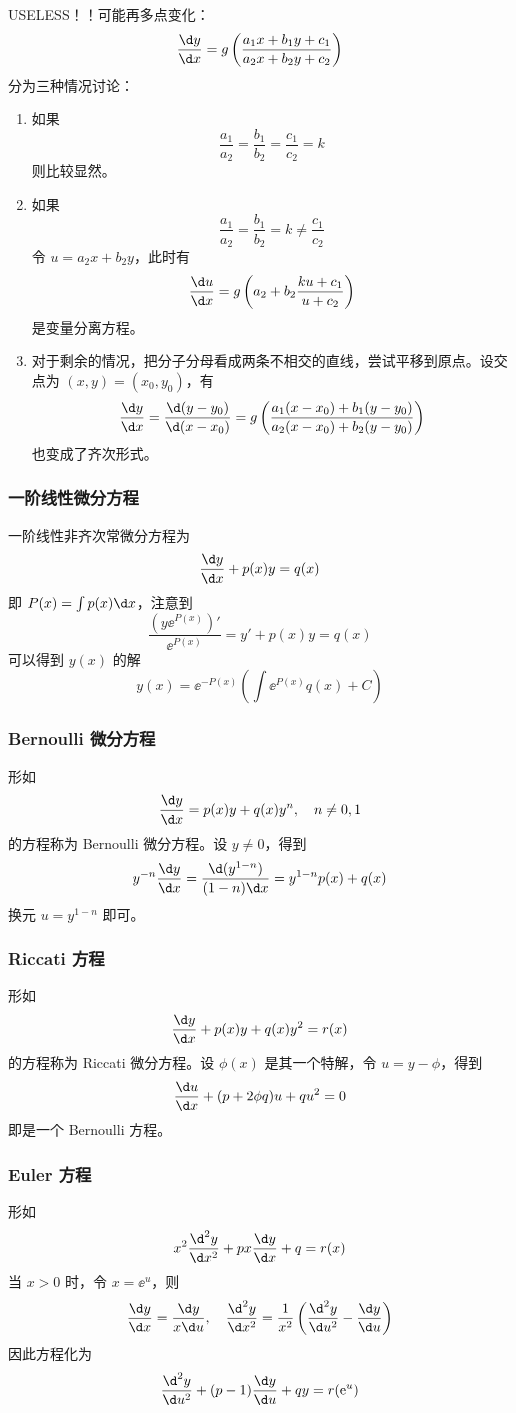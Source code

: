 USELESS！！可能再多点变化：
\[ \frac{\d y}{\d x} = g \left(\frac{a_1 x + b_1 y + c_1}{a_2 x + b_2 y + c_2}\right) \]
分为三种情况讨论：
\begin{enumerate}
	\item 如果
	      \[ \frac{a_1}{a_2} = \frac{b_1}{b_2} = \frac{c_1}{c_2} = k \]
	      则比较显然。
	\item 如果
	      \[ \frac{a_1}{a_2} = \frac{b_1}{b_2} = k \neq \frac{c_1}{c_2} \]
	      令 $u = a_2 x + b_2 y$，此时有
	      \[ \frac{\d u}{\d x} = g \left(a_2 + b_2 \frac{k u + c_1}{u + c_2}\right) \]
	      是变量分离方程。
	\item 对于剩余的情况，把分子分母看成两条不相交的直线，尝试平移到原点。设交点为 $(x, y) = (x_0, y_0)$，有
	      \[ \frac{\d y}{\d x} = \frac{\d (y - y_0)}{\d (x - x_0)} = g \left(\frac{a_1 (x - x_0) + b_1 (y - y_0)}{a_2(x - x_0) + b_2 (y - y_0)} \right) \]
	      也变成了齐次形式。
\end{enumerate}

\subsubsection*{一阶线性微分方程}

一阶线性非齐次常微分方程为
\[ \frac{\d y}{\d x} + p(x) y = q(x) \]
即 $P(x) = \int p(x) \d x$，注意到
\[ \frac{\left(y\ee^{P(x)}\right)'}{\ee^{P(x)}} =  y' + p(x) y = q(x) \]
可以得到 $y(x)$ 的解
\[ y(x) = \ee^{-P(x)} \left( \int \ee^{P(x)} q(x) + C \right)  \]

\subsubsection*{Bernoulli 微分方程} 形如
\[ \frac{\d y}{\d x} = p(x) y + q(x) y^n, \quad n \neq 0,1 \]
的方程称为 Bernoulli 微分方程。设 $y \neq 0$，得到
\[ y^{-n} \frac{\d y}{\d x} = \frac{\d (y^{1-n})}{(1-n)\d x} = y^{1-n}p(x) + q(x) \]
换元 $u = y^{1-n}$ 即可。

\subsubsection*{Riccati 方程}
形如
\[ \frac{\d y}{\d x} + p(x) y + q(x)y^2 = r(x) \]
的方程称为 Riccati 微分方程。设 $\phi(x)$ 是其一个特解，令 $u = y - \phi$，得到
\[ \frac{\d u}{\d x} + (p + 2 \phi q) u + q u^2 = 0 \]
即是一个 Bernoulli 方程。

\subsubsection*{Euler 方程}
形如
\[ x^2 \frac{\d^2 y}{\d x^2} + p x \frac{\d y}{\d x} + q = r(x) \]
当 $x > 0$ 时，令 $x = \ee^u$，则
\[ \frac{\d y}{\d x} = \frac{\d y}{x \d u}, \quad \frac{\d^2 y}{\d x^2} = \frac{1}{x^2} \left( \frac{\d^2 y}{\d u^2} - \frac{\d y}{\d u} \right) \]
因此方程化为
\[ \frac{\d^2 y}{\d u^2} + (p-1) \frac{\d y}{\d u} + qy = r(\ee^u) \]


